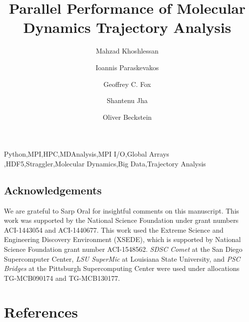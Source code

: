 \documentclass[1p,sort&compress,times]{elsarticle}
\begin{document}
\begin{frontmatter}    

\title{Parallel Performance of Molecular Dynamics Trajectory Analysis}

\author[ASUphysics]{Mahzad Khoshlessan}

\author[Rutgers]{Ioannis Paraskevakos}

\author[IndianaDSC]{Geoffrey C. Fox}

\author[Rutgers]{Shantenu Jha}

\author[ASUphysics,ASUCBP]{Oliver Beckstein}

\address[ASUphysics]{Department of Physics, Arizona State University,
  Tempe, AZ 85281, USA}
\address[Rutgers]{Department of Electrical \& Computer Engineering,
  Rutgers University, Piscataway, NJ 08854, USA}
\address[IndianaDSC]{Digital Science Center, Indiana University,
  Bloomington, IN 47405}
\address[ASUCBP]{Center for Biological Physics, Arizona State University,
  Tempe, AZ 85281, USA}

    


\begin{keyword}
Python\sep MPI\sep HPC\sep MDAnalysis\sep MPI I/O\sep Global Arrays \sep HDF5\sep Straggler\sep Molecular Dynamics\sep Big Data\sep Trajectory Analysis
\end{keyword}

\end{frontmatter}












\subsection*{Acknowledgements}
\label{acknowledgements}


We are grateful to Sarp Oral for insightful comments on this manuscript.
This work was supported by the National Science Foundation under grant numbers ACI-1443054 and ACI-1440677.
This work used the Extreme Science and Engineering Discovery Environment (XSEDE), which is supported by National Science Foundation grant number ACI-1548562.
\emph{SDSC Comet} at the San Diego Supercomputer Center, \emph{LSU SuperMic} at Louisiana State University, and \emph{PSC Bridges} at the Pittsburgh Supercomputing Center were used under allocations TG-MCB090174 and TG-MCB130177.

\section*{References}



\clearpage

\appendix



\end{document}
